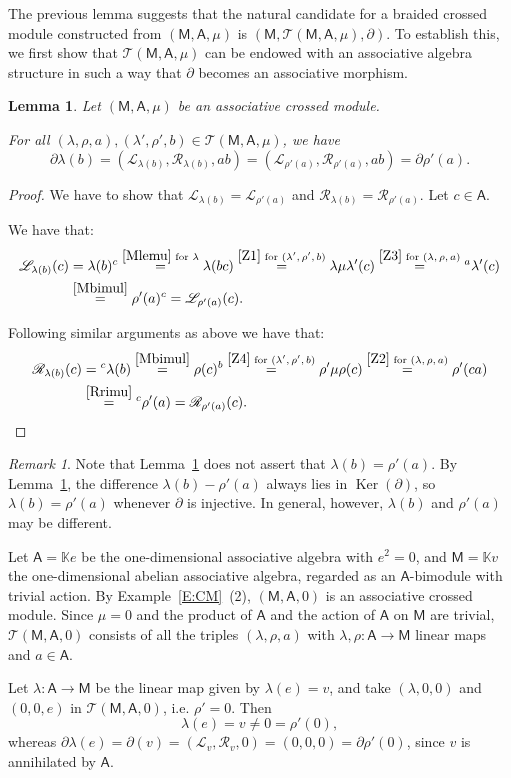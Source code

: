 \documentclass[12pt,reqno]{amsart}
\theoremstyle{plain}
\newtheorem{lemma}[theorem]{Lemma}
\theoremstyle{definition}
\theoremstyle{remark}
\newtheorem{remark}[theorem]{Remark}
\def\lam{\lambda}
\def\Ker{\operatorname{Ker}}
\newcommand{\K}{\ensuremath{\mathbb{K}}}
\newcommand{\A}{\ensuremath{\mathsf{A}}}
\newcommand{\MM}{\ensuremath{\mathsf{M}}}
\newcommand{\T}{\ensuremath{\mathcal{T}}}
\newcommand{\LL}{\ensuremath{\mathcal{L}}}
\newcommand{\RR}{\ensuremath{\mathcal{R}}}
\numberwithin{equation}{section}
\begin{document}
The previous lemma suggests that the natural candidate for a braided crossed module constructed from $(\MM,\A,\mu)$ is $(\MM,\T(\MM,\A,\mu),\partial)$. To establish this, we first show that $\T(\MM,\A,\mu)$ can be endowed with an associative algebra structure in such a way that $\partial$ becomes an associative morphism.		
\begin{lemma}\label{L:comp}
Let $(\MM,\A,\mu)$ be an associative crossed module.
	
For all
	$(\lam,\rho,a),(\lam',\rho',b)\in\T(\MM,\A,\mu)$, we have
	\[\partial\lam(b)=(\LL_{\lam(b)},\RR_{\lam(b)}, ab) = (\LL_{\rho'(a)},\RR_{\rho'(a)},ab) = \partial\rho'(a). \]
\end{lemma}
\begin{proof}
	We have to show that $\LL_{\lambda(b)}=\LL_{\rho'(a)}$ and $\RR_{\lambda(b)}=\RR_{\rho'(a)}$. Let $c\in \A$.
	
	\fbox{$\LL_{\lambda(b)}=\LL_{\rho'(a)}$}  We have that:
	\begin{align*}
		\LL_{\lambda(b)}(c) & =\lambda(b)^{c}\stackrel{\eqref{Mlemu}\text{ for $\lambda$}}{=}\lambda(bc)\stackrel{\eqref{Z1}\text{ for $(\lambda',\rho',b)$}}{=}\lambda\mu\lambda'(c)\stackrel{\eqref{Z3}\text{ for $(\lambda,\rho,a)$}}{=}{}^{a}\lambda'(c)\\
		& \stackrel{\eqref{Mbimul}}{=}\rho'(a)^{c}=\LL_{\rho'(a)}(c).
	\end{align*}
	
	\fbox{$\RR_{\lambda(b)}=\RR_{\rho'(a)}$} Following similar arguments as above we have that:
	\begin{align*}
		\RR_{\lambda(b)}(c) & = {}^{c}\lambda(b)\stackrel{\eqref{Mbimul}}{=}\rho(c)^{b}\stackrel{\eqref{Z4}\text{ for $(\lambda',\rho',b)$}}{=}\rho'\mu\rho(c)\stackrel{\eqref{Z2} \text{ for $(\lambda,\rho,a)$}}{=}\rho'(ca)\\
		& \stackrel{\eqref{Rrimu}}{=} {}^{c}\rho'(a)=\RR_{\rho'(a)}(c). \qedhere
	\end{align*}
\end{proof}

\begin{remark}
	Note that Lemma~\ref{L:comp} does not assert that  $\lam(b)=\rho'(a)$. By Lemma~\ref{L:comp}, the difference $\lam(b)-\rho'(a)$ always lies in $\Ker(\partial)$, so $\lam(b)=\rho'(a)$ whenever $\partial$ is injective. In general, however, $\lam(b)$ and $\rho'(a)$ may be different.
	
	 Let $\A=\K e$ be the one-dimensional associative algebra with $e^2=0$, and  $\MM=\K v$  the one-dimensional abelian associative algebra, regarded as an $\A$-bimodule with trivial action. By Example~\ref{E:CM}~(2), $(\MM,\A,0)$ is an associative crossed module. Since $\mu=0$ and the product of $\A$ and the action of $\A$ on $\MM$ are trivial,  $\T(\MM,\A,0)$ consists of all the triples $(\lam,\rho,a)$ with $\lam,\rho\colon\A\to\MM$ linear maps and $a\in\A$.
	
	Let $\lam \colon\A\to\MM$ be the linear map given by $\lam(e)=v$, and take $(\lam,0,0)$ and $(0,0,e)$ in $\T(\MM,\A,0)$, i.e. $\rho'=0$. Then
	\[
	\lam(e)=v\neq0=\rho'(0),
	\]
	whereas $\partial\lam(e)=\partial(v)=(\LL_v,\RR_v,0)=(0,0,0)=\partial\rho'(0)$, since $v$ is annihilated by $\A$.
\end{remark}
\end{document}
